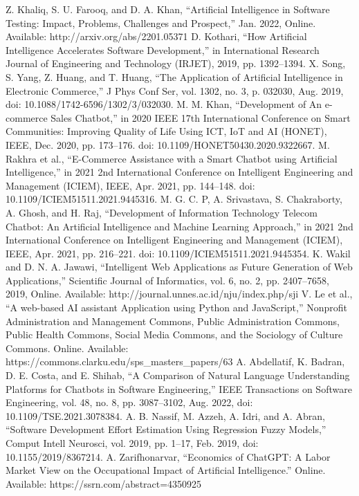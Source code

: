 \documentclass[conference]{IEEEtran}
\begin{document}
\begin{thebibliography}{00}
 Z. Khaliq, S. U. Farooq, and D. A. Khan, “Artificial Intelligence in Software Testing: Impact, Problems, Challenges and Prospect,” Jan. 2022, {Online}. Available: http://arxiv.org/abs/2201.05371 
 D. Kothari, “How Artificial Intelligence Accelerates Software Development,” in International Research Journal of Engineering and Technology (IRJET), 2019, pp. 1392–1394. 
 X. Song, S. Yang, Z. Huang, and T. Huang, “The Application of Artificial Intelligence in Electronic Commerce,” J Phys Conf Ser, vol. 1302, no. 3, p. 032030, Aug. 2019, doi: 10.1088/1742-6596/1302/3/032030. 
 M. M. Khan, “Development of An e-commerce Sales Chatbot,” in 2020 IEEE 17th International Conference on Smart Communities: Improving Quality of Life Using ICT, IoT and AI (HONET), IEEE, Dec. 2020, pp. 173–176. doi: 10.1109/HONET50430.2020.9322667. 
 M. Rakhra et al., “E-Commerce Assistance with a Smart Chatbot using Artificial Intelligence,” in 2021 2nd International Conference on Intelligent Engineering and Management (ICIEM), IEEE, Apr. 2021, pp. 144–148. doi: 10.1109/ICIEM51511.2021.9445316. 
 M. G. C. P, A. Srivastava, S. Chakraborty, A. Ghosh, and H. Raj, “Development of Information Technology Telecom Chatbot: An Artificial Intelligence and Machine Learning Approach,” in 2021 2nd International Conference on Intelligent Engineering and Management (ICIEM), IEEE, Apr. 2021, pp. 216–221. doi: 10.1109/ICIEM51511.2021.9445354. 
 K. Wakil and D. N. A. Jawawi, “Intelligent Web Applications as Future Generation of Web Applications,” Scientific Journal of Informatics, vol. 6, no. 2, pp. 2407–7658, 2019, {Online}. Available: http://journal.unnes.ac.id/nju/index.php/sji 
 V. Le et al., “A web-based AI assistant Application using Python and JavaScript,” Nonprofit Administration and Management Commons, Public Administration Commons, Public Health Commons, Social Media Commons, and the Sociology of Culture Commons. {Online}. Available: https://commons.clarku.edu/sps\_masters\_papers/63 
 A. Abdellatif, K. Badran, D. E. Costa, and E. Shihab, “A Comparison of Natural Language Understanding Platforms for Chatbots in Software Engineering,” IEEE Transactions on Software Engineering, vol. 48, no. 8, pp. 3087–3102, Aug. 2022, doi: 10.1109/TSE.2021.3078384. 
 A. B. Nassif, M. Azzeh, A. Idri, and A. Abran, “Software Development Effort Estimation Using Regression Fuzzy Models,” Comput Intell Neurosci, vol. 2019, pp. 1–17, Feb. 2019, doi: 10.1155/2019/8367214. 
 A. Zarifhonarvar, “Economics of ChatGPT: A Labor Market View on the Occupational Impact of Artificial Intelligence.” {Online}. Available: https://ssrn.com/abstract=4350925 

\end{thebibliography}
\end{document}
